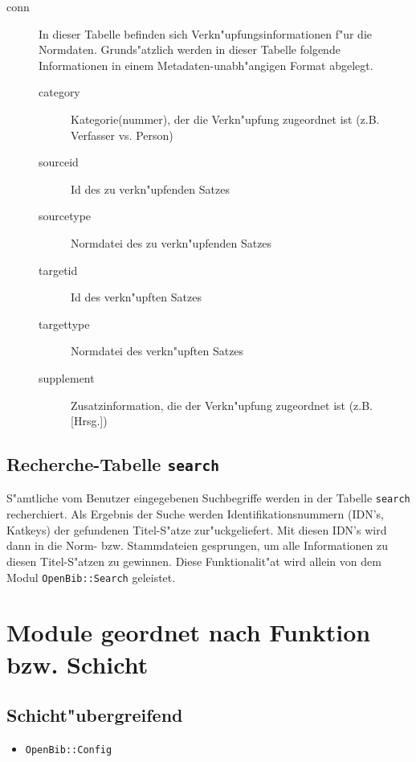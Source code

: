 \documentclass[11pt, twoside, a4paper, BCOR8mm, DIV12, bibtotoc,idxtotoc]{scrbook}
\begin{document}
\begin{description}
\item[conn] In dieser Tabelle befinden sich
  Verkn"upfungsinformationen f"ur die Normdaten. 
  Grunds"atzlich werden in dieser Tabelle folgende Informationen in
  einem Metadaten-unabh"angigen Format abgelegt.
  \begin{description}
  \item[category] Kategorie(nummer), der die Verkn"upfung zugeordnet
    ist (z.B. Verfasser vs. Person)
  \item[sourceid] Id des zu verkn"upfenden Satzes
  \item[sourcetype] Normdatei des zu verkn"upfenden Satzes
  \item[targetid] Id des verkn"upften Satzes
  \item[targettype] Normdatei des verkn"upften Satzes
  \item[supplement] Zusatzinformation, die der Verkn"upfung zugeordnet
    ist (z.B. [Hrsg.])
  \end{description}
\end{description}


\section{Recherche-Tabelle \texttt{search}}

S"amtliche vom Benutzer eingegebenen Suchbegriffe werden in der Tabelle
\texttt{search} recherchiert. Als Ergebnis der Suche werden
Identifikationsnummern (IDN's, Katkeys) der gefundenen Titel-S"atze
zur"uckgeliefert. Mit diesen IDN's wird dann in die Norm- bzw.
Stammdateien gesprungen, um alle Informationen zu diesen Titel-S"atzen
zu gewinnen. Diese Funktionalit"at wird allein von dem Modul
\texttt{OpenBib::Search} geleistet.

\chapter{Module geordnet nach Funktion bzw. Schicht}


\section{Schicht"ubergreifend}


\begin{itemize}
\item \texttt{OpenBib::Config}
\end{itemize}
\end{document}
